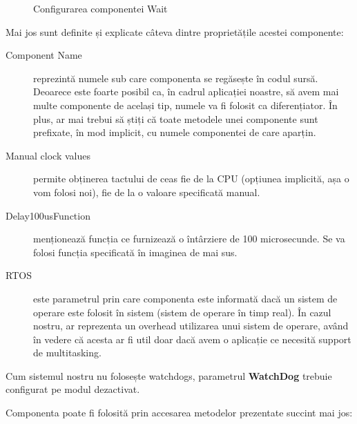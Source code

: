 \begin{figure}
  \vspace{-20pt}
  \vspace{-15pt}
  \caption{\label{fig:CodeWarrior-Wait} Configurarea componentei Wait}
  \vspace{-20pt}
\end{figure}

Mai jos sunt definite și explicate câteva dintre proprietățile acestei componente:

\begin{description}
    \item[Component Name] reprezintă numele sub care componenta se regăsește în codul sursă. Deoarece este foarte posibil ca, în cadrul aplicației noastre, să avem mai multe componente de același tip, numele va fi folosit ca diferențiator. În plus, ar mai trebui să știți că toate metodele unei componente sunt prefixate, în mod implicit, cu numele componentei de care aparțin.
    \item[Manual clock values] permite obținerea tactului de ceas fie de la CPU (opțiunea implicită, așa o vom folosi noi), fie de la o valoare specificată manual.
    \item[Delay100usFunction] menționează funcția ce furnizează o întârziere de 100 microsecunde. Se va folosi funcția specificată în imaginea de mai sus.
    \item[RTOS] este parametrul prin care componenta este informată dacă un sistem de operare este folosit în sistem (sistem de operare în timp real). În cazul nostru, ar reprezenta un overhead utilizarea unui sistem de operare, având în vedere că acesta ar fi util doar dacă avem o aplicație ce necesită support de multitasking.
\end{description}

Cum sistemul nostru nu folosește watchdogs, parametrul \textbf{WatchDog} trebuie configurat pe modul dezactivat.

Componenta poate fi folosită prin accesarea metodelor prezentate succint mai jos:


